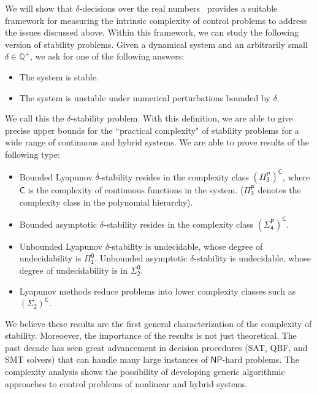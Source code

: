 \documentclass[12pt]{article}
\theoremstyle{plain}
\theoremstyle{definition}
\newcommand{\np}{\mathsf{NP}}
\begin{document}
We will show that $\delta$-decisions over the real numbers~\cite{DBLP:conf/lics/GaoAC12,DBLP:conf/cade/GaoAC12} provides a suitable framework for measuring the intrinsic complexity of control problems to address the issues discussed above. Within this framework, we can study the following version of stability problems. Given a dynamical system and an arbitrarily small $\delta\in \mathbb{Q}^+$, we ask for one of the following answers:
\begin{itemize}
\item The system is stable.
\item The system is unstable under numerical perturbations bounded by $\delta$.
\end{itemize}
We call this the $\delta$-stability problem. With this definition, we are able to give precise upper bounds for the ``practical complexity" of stability problems for a wide range of continuous and hybrid systems. We are able to prove results of the following type:
\begin{itemize}
\item Bounded Lyapunov $\delta$-stability resides in the complexity class $\mathsf{(\Pi^P_3)^C}$, where $\mathsf{C}$ is the complexity of continuous functions in the system. ($\mathsf{\Pi^P_3}$ denotes the complexity class in the polynomial hierarchy).
\item Bounded asymptotic $\delta$-stability resides in the complexity class $\mathsf{(\Sigma^P_4)^C}$.
\item Unbounded Lyapunov $\delta$-stability is undecidable, whose degree of undecidability is $\mathsf{\Pi^0_1}$. Unbounded asymptotic $\delta$-stability is undecidable, whose degree of undecidability is in $\mathsf{\Sigma^0_2}$.
\item Lyapunov methods reduce problems into lower complexity classes such as $\mathsf{(\Sigma_2)^C}$.
\end{itemize}
We believe these results are the first general characterization of the complexity of stability. Moreoever, the importance of the results is not just theoretical. The past decade has seen great advancement in decision procedures (SAT, QBF, and SMT solvers) that can handle many large instances of $\np$-hard problems. The complexity analysis shows the possibility of developing generic algorithmic approaches to control problems of nonlinear and hybrid systems.
\end{document}
